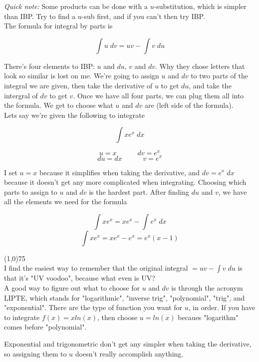 \documentclass[12pt]{report}
\begin{document}
\textit{Quick note:} Some products can be done with a $u$-substitution, which is simpler than IBP. Try to find a $u$-sub first, and if you can't then try IBP. \\

\noindent The formula for integral by parts is

$$
	\int u \; dv = uv - \int v \; du
$$


There's four elements to IBP: $u$ and $du$, $v$ and $dv$. Why they chose letters that look so similar is lost on me. We're going to assign $u$ and $dv$ to two parts of the integral we are given, then take the derivative of $u$ to get $du$, and take the intergral of $dv$ to get $v$. Once we have all four parts, we can plug them all into the formula. We get to choose what $u$ and $dv$ are (left side of the formula). \\

Lets say we're given the following to integrate

$$ \int xe^x \; dx $$

$$ u = x \quad \quad \quad dv = e^x $$
$$ du = dx \quad \quad \quad v = e^x $$

\noindent I set $u = x$ because it simplifies when taking the derivative, and $dv = e^x \; dx$ because it doesn't get any more complicated when integrating. Choosing which parts to assign to $u$ and $dv$ is the hardest part. After finding $du$ and $v$, we have all the elements we need for the formula

$$ \int x e^x = xe^x - \int e^x \; dx $$
$$ \int x e^x = xe^x - e^x = e^x(x-1) $$

\line(1,0){75} \\

I find the easiest way to remember that the original integral $ = uv - \int v \; du $ is that it's "UV voodoo", because what even is UV? \\

A good way to figure out what to choose for $u$ and $dv$ is through the acronym LIPTE, which stands for "logarithmic", "inverse trig", "polynomial", "trig", and "exponential". There are the type of function you want for $u$, in order. If you have to integrate $ f(x) = xln(x) $, then choose $ u = ln(x) $ becaues "logarithm" comes before "polynomial".

Exponential and trigonometric don't get any simpler when taking the derivative, so assigning them to $u$ doesn't really accomplish anything.  

\clearpage
\end{document}
